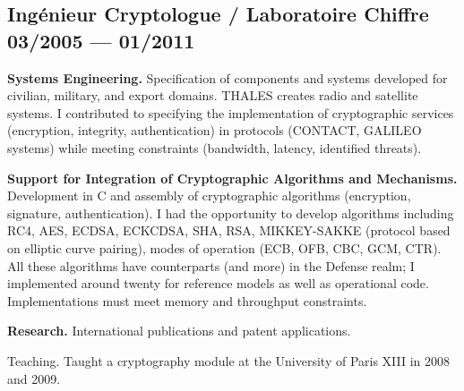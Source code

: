 \subsection{{Ingénieur Cryptologue / Laboratoire Chiffre \hfill 03/2005  --- 01/2011}}
\begin{zitemize}
\item {\bf Systems Engineering.} Specification of components and systems developed for civilian, military, and export domains. THALES creates radio and satellite systems. I contributed to specifying the implementation of cryptographic services (encryption, integrity, authentication) in protocols (CONTACT, GALILEO systems) while meeting constraints (bandwidth, latency, identified threats).

\item {\bf Support for Integration of Cryptographic Algorithms and Mechanisms.} Development in C and assembly of cryptographic algorithms (encryption, signature, authentication). I had the opportunity to develop algorithms including RC4, AES, ECDSA, ECKCDSA, SHA, RSA, MIKKEY-SAKKE (protocol based on elliptic curve pairing), modes of operation (ECB, OFB, CBC, GCM, CTR). All these algorithms have counterparts (and more) in the Defense realm; I implemented around twenty for reference models as well as operational code. Implementations must meet memory and throughput constraints.

\item {\bf Research.} International publications and patent applications.
\item {Teaching.} Taught a cryptography module at the University of Paris XIII in 2008 and 2009.
\end{zitemize}
